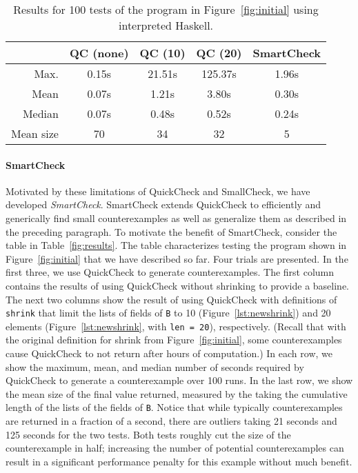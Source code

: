\documentclass[10pt]{sigplanconf}
\newcommand{\ttp}[1]{\texttt{#1}}
\begin{document}
\begin{table}[ht]
\footnotesize
  \begin{center}
    \begin{tabular}{|r||c|c|c|c|}
\hline 
 & QC (none) & QC (10) & QC (20) & SmartCheck \\      
\hline \hline 
Max.  & 0.15s & 21.51s & 125.37s & 1.96s\\
\hline
Mean  & 0.07s & 1.21s & 3.80s & 0.30s\\
\hline
Median & 0.07s & 0.48s & 0.52s & 0.24s\\
\hline
Mean size & 70 & 34 & 32 & 5\\
\hline
    \end{tabular}
  \end{center}
  \caption{Results for 100 tests of the program in Figure~\ref{fig:initial}
    using interpreted Haskell.}
  \label{table:results}
\end{table}


\paragraph{SmartCheck}
Motivated by these limitations of QuickCheck and SmallCheck, we have developed
\emph{SmartCheck}.  SmartCheck extends QuickCheck to efficiently and generically
find small counterexamples as well as generalize them as described in the
preceding paragraph.  To motivate the benefit of SmartCheck, consider the table
in Table~\ref{fig:results}.  The table characterizes testing the program shown
in Figure~\ref{fig:initial} that we have described so far.  Four trials are
presented.  In the first three, we use QuickCheck to generate counterexamples.
The first column contains the results of using QuickCheck without shrinking to
provide a baseline.  The next two columns show the result of using QuickCheck
with definitions of \ttp{shrink} that limit the lists of fields of \ttp{B} to 10
(Figure~\ref{lst:newshrink}) and 20 elements (Figure~\ref{lst:newshrink}, with
\ttp{len = 20}), respectively.  (Recall that with the original definition for
shrink from Figure~\ref{fig:initial}, some counterexamples cause QuickCheck to
not return after hours of computation.)  In each row, we show the maximum, mean,
and median number of seconds required by QuickCheck to generate a counterexample
over 100 runs.  In the last row, we show the mean size of the final value
returned, measured by the taking the cumulative length of the lists of the
fields of \ttp{B}.  Notice that while typically counterexamples are returned in
a fraction of a second, there are outliers taking 21 seconds and 125 seconds for
the two tests.  Both tests roughly cut the size of the counterexample in half;
increasing the number of potential counterexamples can result in a significant
performance penalty for this example without much benefit.
\end{document}
